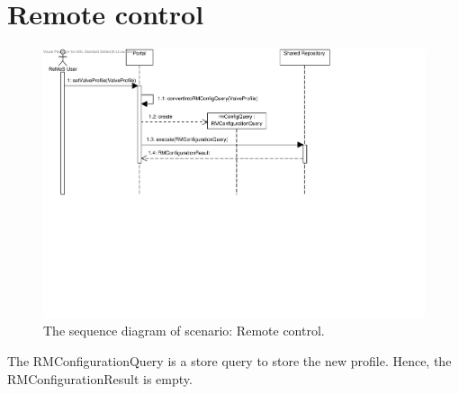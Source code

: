 \section{Remote control}

\begin{figure}[H]
	\begin{centering}
		\includegraphics[width=\textwidth]{figs/scenario-5-4.pdf}
		\caption{The sequence diagram of scenario: Remote control.}
		\label{fig:scenario-5-4}
	\end{centering}
\end{figure}

\npar The RMConfigurationQuery is a store query to store the new profile. Hence,
the RMConfigurationResult is empty.
